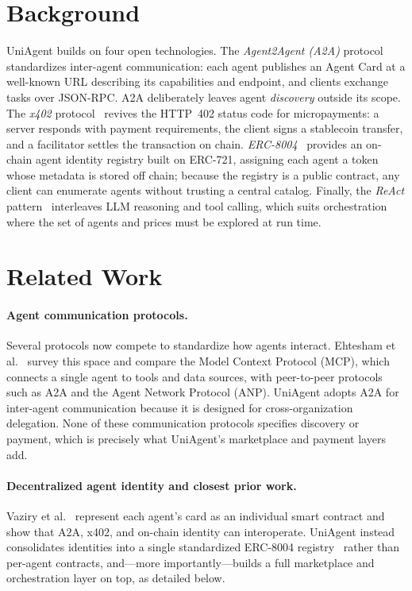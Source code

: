 \documentclass[sigconf]{acmart}
\begin{document}
\section{Background}
\label{sec:background}

UniAgent builds on four open technologies.
The \emph{Agent2Agent (A2A)} protocol~\cite{a2a2025} standardizes
inter-agent communication: each agent publishes an Agent Card at a
well-known URL describing its capabilities and endpoint, and clients
exchange tasks over JSON-RPC. A2A deliberately leaves agent
\emph{discovery} outside its scope.
The \emph{x402} protocol~\cite{x402whitepaper} revives the HTTP~402
status code for micropayments: a server responds with payment
requirements, the client signs a stablecoin transfer, and a facilitator
settles the transaction on chain.
\emph{ERC-8004}~\cite{erc8004} provides an on-chain agent identity
registry built on ERC-721, assigning each agent a token whose metadata
is stored off chain; because the registry is a public contract, any
client can enumerate agents without trusting a central catalog.
Finally, the \emph{ReAct} pattern~\cite{yao2023react} interleaves LLM
reasoning and tool calling, which suits orchestration where the set of
agents and prices must be explored at run time.

\section{Related Work}
\label{sec:related}

\paragraph{Agent communication protocols.}
Several protocols now compete to standardize how agents interact.
Ehtesham et al.~\cite{ehtesham2025survey} survey this space and compare
the Model Context Protocol (MCP), which connects a single
agent to tools and data sources, with peer-to-peer protocols such as
A2A and the Agent Network Protocol (ANP). UniAgent adopts A2A for
inter-agent communication because it is designed for cross-organization
delegation. None of these communication protocols specifies discovery
or payment, which is precisely what UniAgent's marketplace and payment
layers add.

\paragraph{Decentralized agent identity and closest prior work.}
Vaziry et al.~\cite{vaziry2025} represent each agent's card as an
individual smart contract and show that A2A, x402, and on-chain identity
can interoperate. UniAgent instead consolidates identities into a single
standardized ERC-8004 registry~\cite{erc8004} rather than per-agent
contracts, and---more importantly---builds a full marketplace and
orchestration layer on top, as detailed below.
\end{document}
